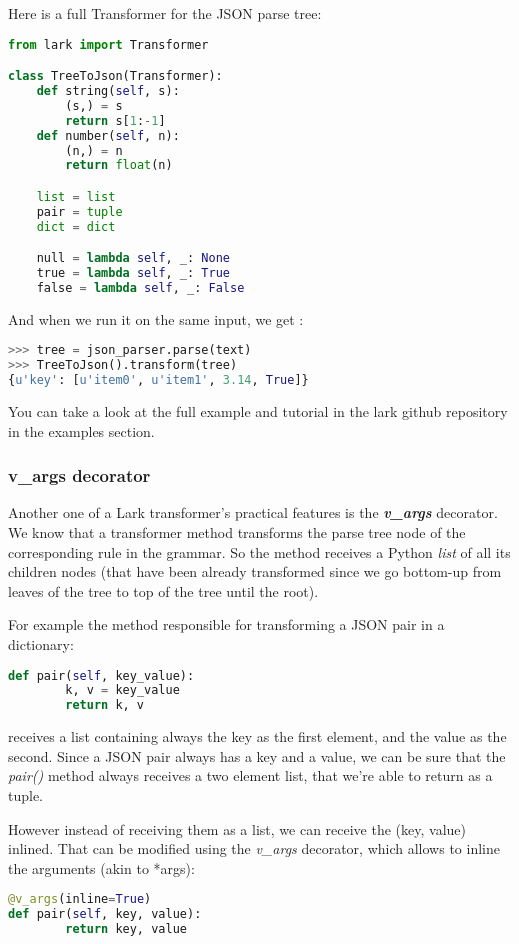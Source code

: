 \documentclass[12pt]{article}
\begin{document}
Here is a full Transformer for the JSON parse tree:

\begin{lstlisting}[language=Python]
from lark import Transformer

class TreeToJson(Transformer):
    def string(self, s):
        (s,) = s
        return s[1:-1]
    def number(self, n):
        (n,) = n
        return float(n)

    list = list
    pair = tuple
    dict = dict

    null = lambda self, _: None
    true = lambda self, _: True
    false = lambda self, _: False
\end{lstlisting}

And when we run it on the same input, we get :

\begin{lstlisting}[language=Python]
>>> tree = json_parser.parse(text)
>>> TreeToJson().transform(tree)
{u'key': [u'item0', u'item1', 3.14, True]}
\end{lstlisting}

You can take a look at the full example and tutorial in the lark github repository in the examples section.

\subsubsection{v\_args decorator}\label{lark:vargs}
Another one of a Lark transformer's practical features is the \textbf{\emph{v\_args}} decorator. We know that a transformer method transforms the parse tree node of the corresponding rule in the grammar. So the method receives a Python \emph{list} of all its children nodes (that have been already transformed since we go bottom-up from leaves of the tree to top of the tree until the root).

For example the method responsible for transforming a JSON pair in a dictionary:
\begin{lstlisting}[language=Python]
def pair(self, key_value):
        k, v = key_value
        return k, v
\end{lstlisting}
receives a list containing always the key as the first element, and the value as the second. Since a JSON pair always has a key and a value, we can be sure that the \emph{pair()} method always receives a two element list, that we're able to return as a tuple.

However instead of receiving them as a list, we can receive the (key, value) inlined. That can be modified using the \emph{v\_args} decorator, which allows to inline the arguments (akin to *args):
\begin{lstlisting}[language=Python]
@v_args(inline=True)
def pair(self, key, value):
        return key, value
\end{lstlisting}
\end{document}

